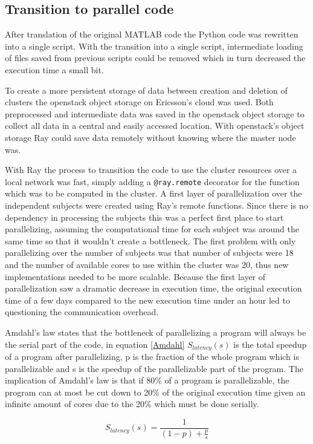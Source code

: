 \documentclass[12pt, a4paper]{article}
\begin{document}
\subsection{Transition to parallel code}
After translation of the original MATLAB code the Python code was
rewritten into a single script.
With the transition into a single script, intermediate loading of files saved from previous scripts could be removed which in turn decreased the execution time a small bit.

To create a more persistent storage of data between creation and deletion of clusters the openstack object storage on Ericsson's cloud was used.
Both preprocessed and intermediate data was saved in the openstack object storage to collect all data in a central and easily accessed location.
With openstack's object storage Ray could save data remotely without knowing where the master node was.

With Ray the process to transition the code to use the cluster resources over a local network was fast, simply adding a \texttt{@ray.remote} decorator for the function which was to be computed in the cluster.
A first layer of parallelization over the independent subjects were created using Ray's remote functions.
Since there is no dependency in processing the subjects this was a perfect first place to start parallelizing, assuming the computational time for each subject was around the same time so that it wouldn't create a bottleneck.
The first problem with only parallelizing over the number of subjects was that number of subjects were 18 and the number of available cores to use within the cluster was 20, thus new implementations needed to be more scalable.
Because the first layer of parallelization saw a dramatic decrease in execution time, the original execution time of a few days compared to the new execution time under an hour led to questioning the communication overhead.

Amdahl's law states that the bottleneck of parallelizing a program will always be the serial part of the code, in equation \eqref{Amdahl} $S_{latency}(s)$ is the total speedup of a program after parallelizing, p is the fraction of the whole program which is parallelizable and s is the speedup of the parallelizable part of the program.
The implication of Amdahl's law is that if 80\% of a program is parallelizable, the program can at most be cut down to 20\% of the original execution time given an infinite amount of cores due to the 20\% which must be done serially.

\begin{equation}\label{Amdahl}
    S_{latency}(s) = \frac{1}{(1-p) + \frac{p}{s}}
\end{equation}
\end{document}
